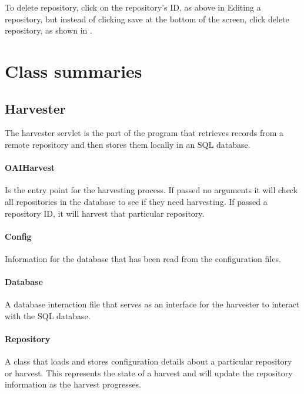 \documentclass[a4paper,11pt]{article}
\begin{document}
To delete repository, click on the repository's ID, as above in Editing a repository, but instead of clicking save at the bottom of the screen, click delete repository, as shown in .

\section{Class summaries}
\label{sec:class_summaries}

\subsection{Harvester}
\label{sec:class_summaries:harvester}

The harvester servlet is the part of the program that retrieves records from a remote repository and then stores them locally in an SQL database.

\paragraph{OAIHarvest}

Is the entry point for the harvesting process. If passed no arguments it will check all repositories in the database to see if they need harvesting. If passed a repository ID, it will harvest that particular repository.

\paragraph{Config}

Information for the database that has been read from the configuration files.

\paragraph{Database}

A database interaction file that serves as an interface for the harvester to interact with the SQL database.

\paragraph{Repository}

A class that loads and stores configuration details about a particular repository or harvest. This represents the state of a harvest and will update the repository information as the harvest progresses.
\end{document}
